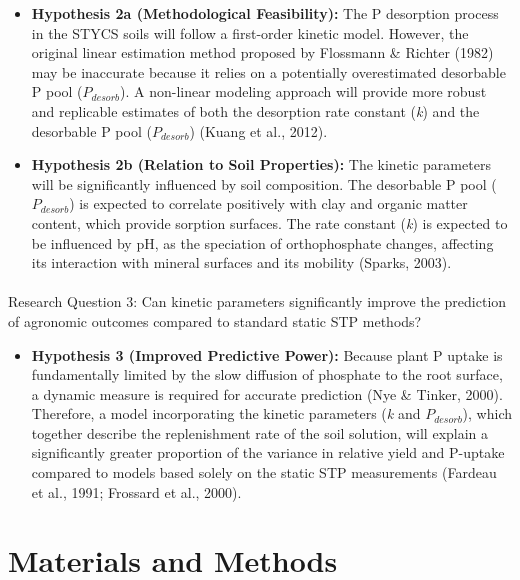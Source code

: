 \documentclass[
  a4paper,
]{article}
\makeatletter
\let\oldparagraph\paragraph
\renewcommand{\paragraph}{
    \@ifstar
      \xxxParagraphStar
      \xxxParagraphNoStar
  }
\newcommand{\xxxParagraphStar}[1]{\oldparagraph*{#1}\mbox{}}
\newcommand{\xxxParagraphNoStar}[1]{\oldparagraph{#1}\mbox{}}
\providecommand{\tightlist}{%
  \setlength{\itemsep}{0pt}\setlength{\parskip}{0pt}}
\makeatother
\begin{document}
\begin{itemize}
\item
  \textbf{Hypothesis 2a (Methodological Feasibility):} The P desorption
  process in the STYCS soils will follow a first-order kinetic model.
  However, the original linear estimation method proposed by Flossmann
  \& Richter (1982) may be inaccurate because it relies on a potentially
  overestimated desorbable P pool (\(P_{desorb}\)). A non-linear
  modeling approach will provide more robust and replicable estimates of
  both the desorption rate constant (\emph{k}) and the desorbable P pool
  (\(P_{desorb}\)) (Kuang et al., 2012).
\item
  \textbf{Hypothesis 2b (Relation to Soil Properties):} The kinetic
  parameters will be significantly influenced by soil composition. The
  desorbable P pool (\(P_{desorb}\)) is expected to correlate positively
  with clay and organic matter content, which provide sorption surfaces.
  The rate constant (\emph{k}) is expected to be influenced by pH, as
  the speciation of orthophosphate changes, affecting its interaction
  with mineral surfaces and its mobility (Sparks, 2003).
\end{itemize}

\paragraph{Research Question 3: Can kinetic parameters significantly
improve the prediction of agronomic outcomes compared to standard static
STP
methods?}\label{research-question-3-can-kinetic-parameters-significantly-improve-the-prediction-of-agronomic-outcomes-compared-to-standard-static-stp-methods}

\begin{itemize}
\tightlist
\item
  \textbf{Hypothesis 3 (Improved Predictive Power):} Because plant P
  uptake is fundamentally limited by the slow diffusion of phosphate to
  the root surface, a dynamic measure is required for accurate
  prediction (Nye \& Tinker, 2000). Therefore, a model incorporating the
  kinetic parameters (\emph{k} and \(P_{desorb}\)), which together
  describe the replenishment rate of the soil solution, will explain a
  significantly greater proportion of the variance in relative yield and
  P-uptake compared to models based solely on the static STP
  measurements (Fardeau et al., 1991; Frossard et al., 2000).
\end{itemize}

\section{Materials and Methods}\label{sec-materials-and-methods}
\end{document}
